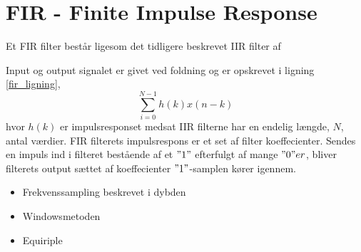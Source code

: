 \section{FIR - Finite Impulse Response}\label{sec:fir}
Et FIR filter består ligesom det tidligere beskrevet IIR filter af 

Input og output signalet er givet ved foldning og er opskrevet i ligning \ref{fir_ligning},
\begin {equation} 
\sum\limits_{i=0}^{N-1} h(k)x(n-k) \label{fir_ligning}
\end {equation}
hvor $h(k)$ er impulsresponset medsat IIR filterne har en endelig længde, $N$, antal værdier. FIR filterets impulsrespons er et set af filter koeffecienter. Sendes en impuls ind i filteret bestående af et $"1"$ efterfulgt af mange $"0"er$, bliver filterets output sættet af koeffecienter $"1"$-samplen kører igennem. 


\begin{itemize}
	\item Frekvenssampling beskrevet i dybden
	\item Windowsmetoden
	\item Equiriple
\end{itemize}


